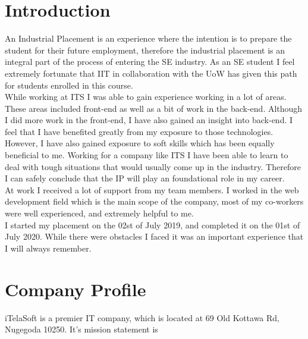\documentclass[12pt]{article}
\begin{document}
\section{Introduction}
An Industrial Placement is an experience where the intention is to prepare the student for their
future employment, therefore the industrial placement is an integral part of the process of 
entering the SE industry. As an SE student I feel extremely fortunate that IIT in collaboration with
the UoW has given this path for students enrolled in this course.\\
\newline
While working at ITS I was able to gain experience working in a lot of areas. These areas included 
front-end as well as a bit of work in the back-end. Although I did more work in the front-end, I have
also gained an insight into back-end. I feel that I have benefited greatly from my exposure to those 
technologies. However, I have also gained exposure to soft skills which has been equally beneficial
to me. Working for a company like ITS I have been able to learn to deal with tough situations
that would usually come up in the industry. Therefore I can safely conclude that the IP will play
an foundational role in my career.\\
\newline
At work I received a lot of support from my team members. I worked in the web development field which
is the main scope of the company, most of my co-workers were well experienced, and extremely helpful
to me.\\
\newline
I started my placement on the 02st of July 2019, and completed it on the 01st of July 2020. While 
there were obstacles I faced it was an important experience that I will always remember.
\newpage

\section{Company Profile}
iTelaSoft is a premier IT company, which is located at 69 Old Kottawa Rd, Nugegoda 10250. It's
mission statement is 
\end{document}
